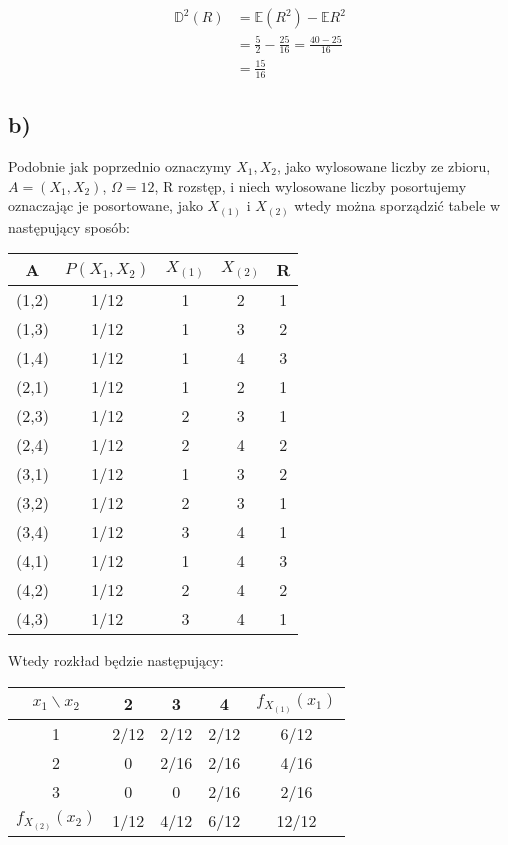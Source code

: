 \documentclass{article}
\begin{document}
\begin{align*}
\mathbb{D}^2(R) & = \mathbb{E}(R^2) - \mathbb{E}R^2 \\
& = \frac{5}{2} - \frac{25}{16} = \frac{40-25}{16} \\
& =  \frac{15}{16}
\end{align*}

\subsection*{b)}
Podobnie jak poprzednio oznaczymy $X_1, X_2$, jako wylosowane liczby ze zbioru, $A = (X_1,X_2) $, $\Omega = 12$, R rozstęp, i niech wylosowane liczby posortujemy oznaczając je posortowane, jako $X_{(1)} $ i $X_{(2)} $ wtedy można sporządzić tabele w następujący sposób:

\begin{center}
\begin{tabular}{|c|c|c|c|c|}
\hline
A & $P(X_1,X_2)$ & $X_{(1)}$ & $X_{(2)}$ & R\\
\hline
(1,2) & 1/12 & 1 & 2 & 1\\
\hline
(1,3) & 1/12 & 1 & 3 & 2\\
\hline
(1,4) & 1/12 & 1 & 4 & 3\\
\hline
(2,1) & 1/12 & 1 & 2 & 1\\
\hline
(2,3) & 1/12 & 2 & 3 & 1\\
\hline
(2,4) & 1/12 & 2 & 4 & 2\\
\hline
(3,1) & 1/12 & 1 & 3 & 2\\
\hline
(3,2) & 1/12 & 2 & 3 & 1\\
\hline
(3,4) & 1/12 & 3 & 4 & 1\\
\hline
(4,1) & 1/12 & 1 & 4 & 3\\
\hline
(4,2) & 1/12 & 2 & 4 & 2\\
\hline
(4,3) & 1/12 & 3 & 4 & 1\\
\hline
\end{tabular}
\end{center}

Wtedy rozkład będzie następujący:

\begin{center}
\begin{tabular}{|c|c|c|c|c|}
\hline
$x_1 \backslash x_2$ & 2 & 3 & 4 & $f_{X_{(1)}}(x_1)$ \\
\hline
1 & 2/12 & 2/12 & 2/12 & 6/12 \\
\hline
2 & 0 & 2/16 & 2/16 & 4/16 \\
\hline
3 & 0 & 0 & 2/16 & 2/16 \\
\hline
$f_{X_{(2)}}(x_2)$ & 1/12 & 4/12 & 6/12 & 12/12 \\
\hline
\end{tabular}
\end{center}
\end{document}
